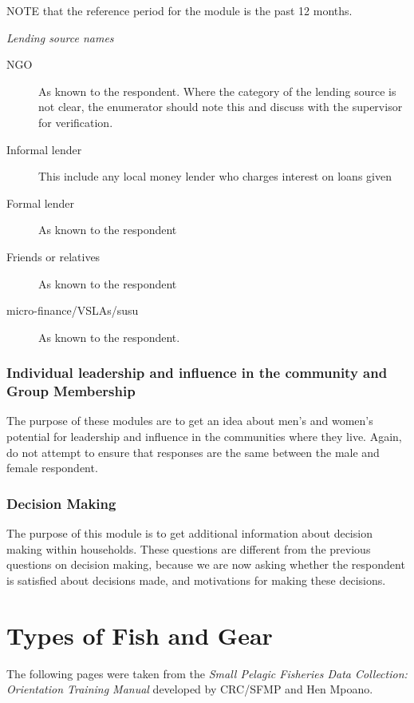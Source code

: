 \documentclass[a4paper]{refart}
\begin{document}
NOTE that the reference period for the module is the past 12 months.

\textit{Lending source names}
\begin{description}
\item[NGO] As known to the respondent. Where the category of the lending source is not clear, the enumerator should note this and discuss with the supervisor for verification.
\item[Informal lender] This include any local money lender who charges interest on loans given
\item[Formal lender] As known to the respondent
\item[Friends or relatives]  As known to the respondent
\item[micro-finance/VSLAs/susu]  As known to the respondent.
\end{description}

\subsubsection{Individual leadership and influence in the community and Group Membership}
The purpose of these modules are to get an idea about men's and women's potential for leadership and influence in the communities where they live. Again, do not attempt to ensure that responses are the same between the male and female respondent.

\subsubsection{Decision Making}
The purpose of this module is to get additional information about decision making within households. These questions are different from the previous questions on decision making, because we are now asking whether the respondent is satisfied about decisions made, and motivations for making these decisions.

\section{Types of Fish and Gear}
The following pages were taken from the \textit{Small Pelagic Fisheries Data Collection: Orientation Training Manual} developed by CRC/SFMP and Hen Mpoano.



\end{document}
